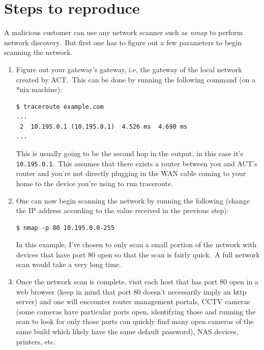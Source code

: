\documentclass[11pt]{article}
\begin{document}
    \section{Steps to reproduce}\label{sec:steps-to-reproduce}
    A malicious customer can use any network scanner such as \emph{nmap} to perform network discovery.\ But first
    one has to figure out a few parameters to begin scanning the network.
    \begin{enumerate}[leftmargin=*]
        \item Figure out your gateway's gateway, i.e, the gateway of the local network created by ACT.\ This can be done
        by running the following command (on a *nix machine):
        \begin{verbatim}
$ traceroute example.com
...
 2  10.195.0.1 (10.195.0.1)  4.526 ms  4.690 ms
...
        \end{verbatim}
        This is usually going to be the second hop in the output, in this case it's \texttt{10.195.0.1}.\ This assumes
        that there exists a router between you and ACT's router and you're not directly plugging in the WAN cable coming
        to your home to the device you're using to run traceroute.

        \item One can now begin scanning the network by running the following (change the IP address according to
        the value received in the previous step):
        \begin{verbatim}
$ nmap -p 80 10.195.0.0-255
        \end{verbatim}
        In this example, I've chosen to only scan a small portion of the network with devices that have port 80 open
        so that the scan is fairly quick.\ A full network scan would take a very long time.

        \item Once the network scan is complete, visit each host that has port 80 open in a web browser (keep in mind
        that port 80 doesn't necessarily imply an http server) and one will encounter router management portals, CCTV
        cameras (some cameras have particular ports open, identifying those and running the scan to look for only
        those ports can quickly find many open cameras of the same build which likely have the same default password),
        NAS devices, printers, etc.\
    \end{enumerate}
\end{document}
